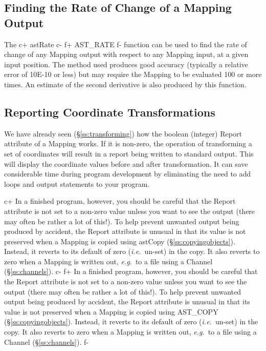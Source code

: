 \documentclass[twoside,11pt]{article}
\newcommand{\secref}[1]{\S\ref{#1}}
\newcommand{\secref}[1]{\ref{#1}}
\begin{document}
\subsection{Finding the Rate of Change of a Mapping Output}
The
c+
astRate
c-
f+
AST\_RATE
f-
function can be used to find the rate of change of any Mapping output
with respect to any Mapping input, at a given input position. The method
used produces good accuracy (typically a relative error of 10E-10 or
less) but may require the Mapping to be evaluated 100 or more times. 
An estimate of the second derivative is also produced by this function.


\subsection{Reporting Coordinate Transformations}

We have already seen (\secref{ss:transforming}) how the boolean
(integer) Report attribute of a Mapping works. If it is non-zero, the
operation of transforming a set of coordinates will result in a report
being written to standard output. This will display the coordinate
values before and after transformation. It can save considerable time
during program development by eliminating the need to add loops and
output statements to your program.

c+
In a finished program, however, you should be careful that the Report
attribute is not set to a non-zero value unless you want to see the
output (there may often be rather a lot of this!). To help prevent
unwanted output being produced by accident, the Report attribute is
unusual in that its value is not preserved when a Mapping is copied
using astCopy (\secref{ss:copyingobjects}). Instead, it reverts to its
default of zero ({\em{i.e.}}\ un-set) in the copy. It also reverts to
zero when a Mapping is written out, {\em{e.g.}}\ to a file using a
Channel (\secref{ss:channels}).
c-
f+
In a finished program, however, you should be careful that the Report
attribute is not set to a non-zero value unless you want to see the
output (there may often be rather a lot of this!). To help prevent
unwanted output being produced by accident, the Report attribute is
unusual in that its value is not preserved when a Mapping is copied
using AST\_COPY (\secref{ss:copyingobjects}). Instead, it reverts to
its default of zero ({\em{i.e.}}\ un-set) in the copy. It also reverts
to zero when a Mapping is written out, {\em{e.g.}}\ to a file using a
Channel (\secref{ss:channels}).
f-
\end{document}
